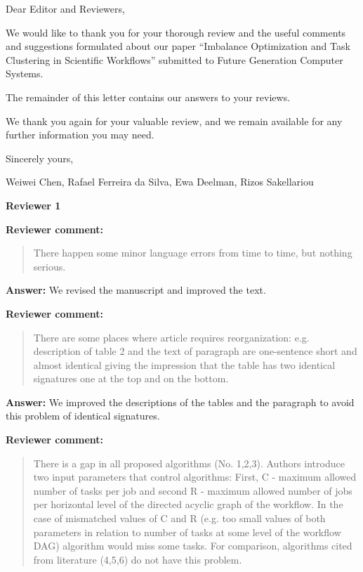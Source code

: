 \documentclass{letter}
\date{July 31st 2014}
\newenvironment{review}%
{\textbf{Reviewer comment:}\begin{quote}}%
{\end{quote}}%
\newcommand{\answer}[1]{%
      \textbf{Answer:} #1}
\begin{document}
\begin{letter}{}

\opening{Dear Editor and Reviewers,}

We would like to thank you for your thorough review and the useful
comments and suggestions formulated about our paper ``Imbalance Optimization and Task Clustering in Scientific Workflows'' submitted to
Future Generation Computer Systems.

The remainder of this letter contains our answers to your reviews. 

We thank you again for your valuable review, and we remain available for any further information you may need.

\vspace{0.5cm}

Sincerely yours,

\vspace{1cm}

Weiwei Chen, Rafael Ferreira da Silva, Ewa Deelman, Rizos Sakellariou

\newpage

\textbf{Reviewer 1}


\begin{review}
There happen some minor language errors from time to time, but nothing serious. 
\end{review}

\answer{We revised the manuscript {and improved }the text.}


\begin{review}
There are some places where article requires reorganization: e.g. description of table 2 and the text of paragraph are one-sentence short and almost identical giving the impression that the table has two identical signatures one at the top and on the bottom. 
\end{review}

\answer{We improved the descriptions of the tables and the paragraph to avoid this problem of identical signatures.}


\begin{review}
There is a gap in all proposed algorithms (No. 1,2,3). Authors introduce two input parameters that control algorithms: First, C - maximum allowed number of tasks per job and second R - maximum allowed number of jobs per horizontal level of the directed acyclic graph of  the workflow. In the case of mismatched values of C and R (e.g. too small values of both parameters in relation to number of tasks at some level of the workflow DAG) algorithm would miss some tasks. For comparison, algorithms cited from literature (4,5,6) do not have this problem.
\end{review}


\end{letter}
\end{document}
